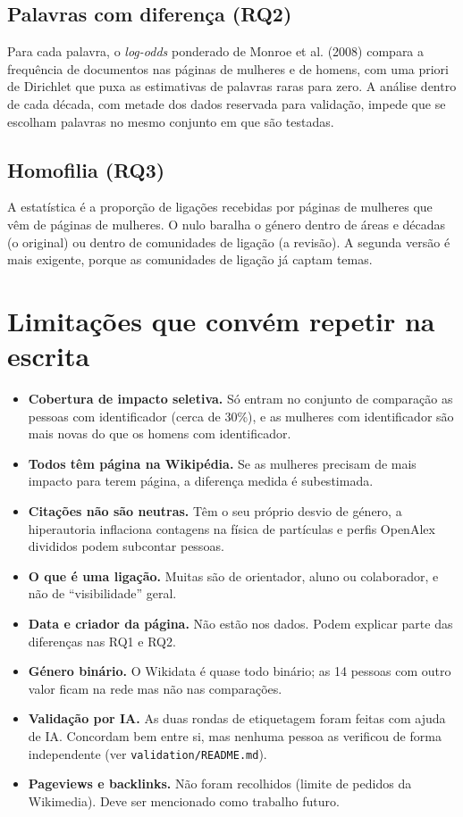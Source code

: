 \documentclass[11pt,a4paper]{article}
\newcommand{\file}[1]{\texttt{#1}}
\begin{document}
\subsection{Palavras com diferença (RQ2)}

Para cada palavra, o \emph{log-odds} ponderado de Monroe et al. (2008) compara a frequência de documentos nas páginas de mulheres e de homens, com uma priori de Dirichlet que puxa as estimativas de palavras raras para zero. A análise dentro de cada década, com metade dos dados reservada para validação, impede que se escolham palavras no mesmo conjunto em que são testadas.

\subsection{Homofilia (RQ3)}

A estatística é a proporção de ligações recebidas por páginas de mulheres que vêm de páginas de mulheres. O nulo baralha o género dentro de áreas e décadas (o original) ou dentro de comunidades de ligação (a revisão). A segunda versão é mais exigente, porque as comunidades de ligação já captam temas.

\section{Limitações que convém repetir na escrita}

\begin{itemize}
  \item \textbf{Cobertura de impacto seletiva.} Só entram no conjunto de comparação as pessoas com identificador (cerca de 30\%), e as mulheres com identificador são mais novas do que os homens com identificador.
  \item \textbf{Todos têm página na Wikipédia.} Se as mulheres precisam de mais impacto para terem página, a diferença medida é subestimada.
  \item \textbf{Citações não são neutras.} Têm o seu próprio desvio de género, a hiperautoria inflaciona contagens na física de partículas e perfis OpenAlex divididos podem subcontar pessoas.
  \item \textbf{O que é uma ligação.} Muitas são de orientador, aluno ou colaborador, e não de ``visibilidade'' geral.
  \item \textbf{Data e criador da página.} Não estão nos dados. Podem explicar parte das diferenças nas RQ1 e RQ2.
  \item \textbf{Género binário.} O Wikidata é quase todo binário; as 14 pessoas com outro valor ficam na rede mas não nas comparações.
  \item \textbf{Validação por IA.} As duas rondas de etiquetagem foram feitas com ajuda de IA. Concordam bem entre si, mas nenhuma pessoa as verificou de forma independente (ver \file{validation/README.md}).
  \item \textbf{Pageviews e backlinks.} Não foram recolhidos (limite de pedidos da Wikimedia). Deve ser mencionado como trabalho futuro.
\end{itemize}
\end{document}
